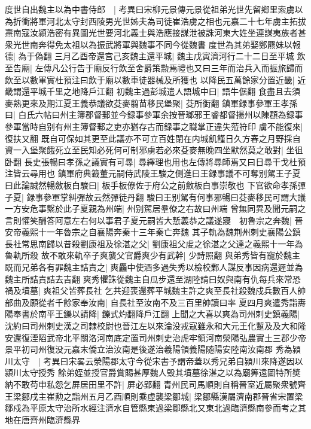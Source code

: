度世自出魏主以為中書侍郎　|{
	考異曰宋柳元景傳元景從祖弟光世先留鄉里索虜以為折衝將軍河北太守封西陵男光世姊夫為司徒崔浩虜之相也元嘉二十七年虜主拓拔燾南寇汝潁浩密有異圖光世要河北義士與浩應接謀泄被誅河東大姓坐連謀夷族者甚衆光世南奔得免太祖以為振武將軍與魏事不同今從魏書}
度世為其弟娶鄭羆妹以報德|{
	為于偽翻}
三月乙酉帝還宫己亥魏主還平城|{
	魏主戊寅濟河行二十二日至平城}
飲至告廟|{
	左傳凡公行告于廟反行飲至舍爵策勲焉禮也又曰三年而治兵入而振旅歸而飲至以數軍實杜預注曰飲于廟以數車徒器械及所獲也}
以降民五萬餘家分置近畿|{
	近畿謂還平城千里之地降戶江翻}
初魏主過彭城遣人語城中曰|{
	語牛倨翻}
食盡且去須麥熟更來及期江夏王義恭議欲芟麥翦苗移民堡聚|{
	芟所衘翻}
鎮軍録事參軍王孝孫曰|{
	白氏六帖曰州主簿郡督郵並今録事參軍余按晉瑯邪王睿都督揚州以陳頵為録事參軍當時自别有州主簿督郵之吏亦猶存古而録事之職掌正違失蒞符印}
虜不能復來|{
	復扶又翻}
既自可保如其更至此議亦不可立百姓閉在内城飢饉日久方春之月野採自資一入堡聚餓死立至民知必死何可制邪虜若必來芟麥無晚四坐默然莫之敢對|{
	坐徂卧翻}
長史張暢曰孝孫之議實有可尋|{
	尋繹理也用也左傳將尋師焉又曰日尋干戈杜預注皆云尋用也}
鎮軍府典籖董元嗣侍武陵王駿之側進曰王録事議不可奪别駕王子夏曰此論誠然暢斂板白駿曰|{
	板手板僚佐于府公之前斂板白事崇敬也}
下官欲命孝孫彈子夏|{
	録事參軍掌糾彈故云然彈徒丹翻}
駿曰王别駕有何事邪暢曰芟麥移民可謂大議一方安危事繫於此子夏親為州端|{
	州别駕居羣僚之右故曰州端}
曾無同異及聞元嗣之言則懽笑酬答阿意左右何以事君子夏元嗣皆大慙義恭之議遂寢　初魯宗之奔魏|{
	晉安帝義熙十一年魯宗之自襄陽奔秦十三年秦亡奔魏}
其子軌為魏荆州刺史襄陽公鎮長社常思南歸以昔殺劉康祖及徐湛之父|{
	劉康祖父䖍之徐湛之父達之義熙十一年為魯軌所殺}
故不敢來軌卒子爽襲父官爵爽少有武幹|{
	少詩照翻}
與弟秀皆有寵於魏主既而兄弟各有罪魏主詰責之|{
	爽麤中使酒多過失秀以檢校鄴人謀反事因病還遲並為魏主所詰責詰去吉翻}
爽秀懼誅從魏主自瓜步還至湖陸請曰奴與南有仇每兵來常恐禍及墳墓|{
	爽祖父皆葬長社}
乞共迎喪還葬平城魏主許之爽至長社殺魏戍兵數百人帥部曲及願從者千餘家奉汝南|{
	自長社至汝南不及三百里帥讀曰率}
夏四月爽遣秀詣夀陽奉書於南平王鑠以請降|{
	鑠式灼翻降戶江翻}
上聞之大喜以爽為司州刺史鎮義陽|{
	沈約曰司州刺史漢之司隸校尉也晉江左以來淪没戎寇雖永和大元王化蹔及及大和隆安還復湮䧟武帝北平關洛河南底定置司州刺史治虎牢領河南滎陽弘農實土三郡少帝景平初司州復没元嘉末僑立治汝南是後遂治羲陽領義陽随陽安陸南汝南郡}
秀為潁川太守　|{
	考異曰宋畧云滎陽郡太守今從宋書予謂帝蓋以秀兄弟自潁川來降遂因以潁川太守授秀}
餘弟姪並授官爵賞賜甚厚魏人毁其墳墓徐湛之以為廟筭遠圖特所奬納不敢苟申私怨乞屏居田里不許|{
	屏必郢翻}
青州民司馬順則自稱晉室近屬聚衆號齊王梁鄒戌主崔勲之詣州五月乙酉順則乘虛襲梁鄒城|{
	梁鄒縣漢屬濟南郡晉省宋置梁鄒戍為平原太守治所水經注濟水自管縣東過梁鄒縣北又東北過臨濟縣南參而考之其地在唐齊州臨濟縣界}
